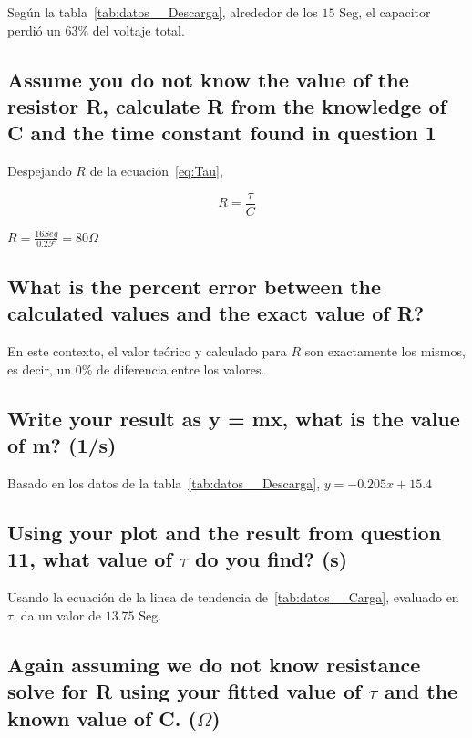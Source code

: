 \documentclass[twocolumn, 12pt]{article}
\begin{document}
Según la tabla~\ref{tab:datos__Descarga}, alrededor de los
$15$ Seg, el capacitor perdió un $63\%$ del voltaje total.

\subsection{Assume you do not know the value of the resistor R, calculate R from the knowledge of
    C and the time constant found in question 1}

Despejando $R$ de la ecuación~\eqref{eq:Tau},

{\large
        \begin{equation}
            R = \frac{\tau}{C}
        \end{equation}
    }

$R = \frac{16 Seg}{0.2\mathcal{F}} = 80 \Omega$

\subsection{What is the percent error between the calculated values and the exact value of R?}

En este contexto, el valor teórico y calculado para $R$ son
exactamente los mismos, es decir, un 0\% de diferencia
entre los valores.

\subsection{Write your result as y = mx, what is the value of m? (1/s)}

Basado en los datos de la tabla~\ref{tab:datos__Descarga},
$y= -0.205x + 15.4$

\subsection{Using your plot and the result from question 11, what value of $\tau$ do you find? (s)}

Usando la ecuación de la linea de tendencia
de~\ref{tab:datos__Carga}, evaluado en $\tau$, da un valor
de $13.75$ Seg.

\subsection{Again assuming we do not know resistance solve for R using your fitted value of $\tau$ and
    the known value of C. ($\Omega$)}
\end{document}
